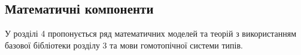 \subsection*{Математичні компоненти}

У розділі 4 пропонується ряд математичних моделей та теорій з використанням
базової бібліотеки розділу 3 та мови гомотопічної системи типів.



